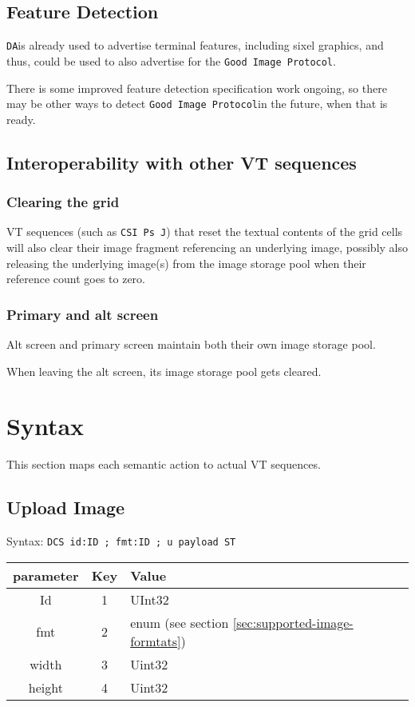 \documentclass{article}
\newcommand{\code}[1]{\colorbox{light-gray}{\texttt{#1}}}
\newcommand{\DA}{\code{DA}}
\newcommand{\GoodImageProtocol}{\code{Good Image Protocol}}
\begin{document}
\subsection{Feature Detection}

\DA is already used to advertise terminal features, including sixel graphics, and thus,
could be used to also advertise for the \GoodImageProtocol.

There is some improved feature detection specification work ongoing,
so there may be other ways to detect \GoodImageProtocol in the future, when that is ready.

\subsection{Interoperability with other VT sequences}

\subsubsection*{Clearing the grid}

VT sequences (such as \code{CSI Ps J}) that reset the textual contents of the grid cells will also
clear their image fragment referencing an underlying image, possibly also releasing the
underlying image(s) from the image storage pool when their reference count goes to zero.

\subsubsection*{Primary and alt screen}

Alt screen and primary screen maintain both their own image storage pool.

When leaving the alt screen, its image storage pool gets cleared.
\section{Syntax} %

This section maps each semantic action to actual VT sequences.

\subsection{Upload Image}

Syntax: \code{DCS id:ID ; fmt:ID ; u payload ST}

\begin{tabular}{ |c|c|l| }
    \hline
    parameter   & Key & Value \\
    \hline
    Id          & 1   & UInt32 \\
    fmt         & 2   & enum (see section \ref{sec:supported-image-formtats}) \\
    width       & 3   & Uint32 \\
    height      & 4   & Uint32 \\
    \hline
\end{tabular}
\end{document}
